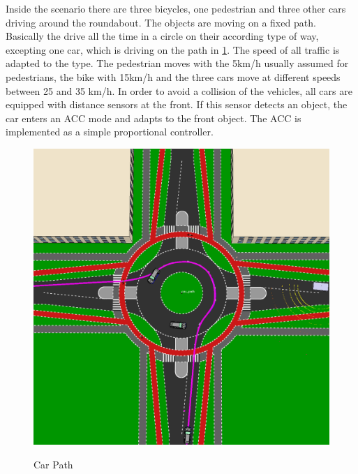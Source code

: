 \documentclass[11pt,oneside,openright]{mpreport}
\begin{document}

Inside the scenario there are three bicycles, one pedestrian and three other cars driving around the roundabout. 
The objects are moving on a fixed path. Basically the drive all the time in a circle on their according type of way,
excepting one car, which is driving on the path in \cref{car_path1}.
The speed of all traffic is adapted to the type. The pedestrian moves with the 5km/h usually assumed for pedestrians,
the bike with 15km/h and the three cars move at different speeds between 25 and 35 km/h. In order to avoid a collision of the vehicles,
all cars are equipped with distance sensors at the front. If this sensor detects an object, the car enters an \acl{ACC} mode and adapts to the front object.
The \acl{ACC} is implemented as a simple proportional controller.

\begin{figure}[!htb]
  \caption{Car Path} 
  \centering
  \includegraphics[width=\textwidth]{bilder/car_path.png}
 \label{car_path1}
\end{figure}
\end{document}
